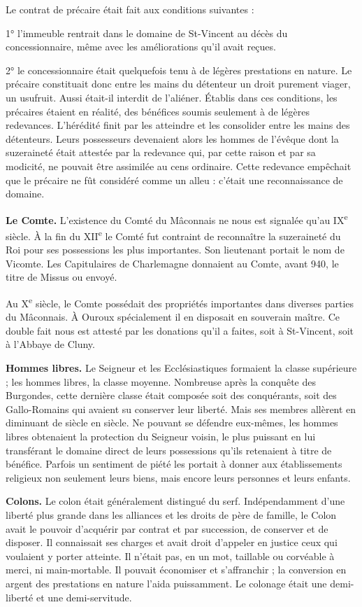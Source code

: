 \documentclass[11pt,a4paper]{report}
\begin{document}
Le contrat de précaire était fait aux conditions suivantes :

1° l'immeuble rentrait dans le domaine de St-Vincent au décès du concessionnaire,
même avec les améliorations qu'il avait reçues.

2° le concessionnaire était quelquefois tenu à de légères prestations en nature.
Le précaire constituait donc entre les mains du détenteur un droit purement
viager, un usufruit. Aussi était-il interdit de l'aliéner. Établis dans ces
conditions, les précaires étaient en réalité, des bénéfices soumis seulement à
de légères redevances. L'hérédité finit par les atteindre et les consolider entre
les mains des détenteurs. Leurs possesseurs devenaient alors les hommes de
l'évêque dont la suzeraineté était attestée par la redevance qui, par cette
raison et par sa modicité, ne pouvait être assimilée au cens ordinaire. Cette
redevance empêchait que le précaire ne fût considéré comme un alleu : c'était une
reconnaissance de domaine.

\textbf{Le Comte.} L'existence du Comté du Mâconnais ne nous est signalée qu'au
IX\textsuperscript{e} siècle. À la fin du XII\textsuperscript{e} le Comté fut
contraint de reconnaître la suzeraineté du Roi pour ses possessions les plus
importantes. Son lieutenant portait le nom de Vicomte. Les Capitulaires de
Charlemagne donnaient au Comte, avant 940, le titre de Missus ou envoyé.

Au X\textsuperscript{e} siècle, le Comte possédait des propriétés importantes
dans diverses parties du Mâconnais. À Ouroux spécialement il en disposait en
souverain maître. Ce double fait nous est attesté par les donations qu'il a
faites, soit à St-Vincent, soit à l'Abbaye de Cluny.

\textbf{Hommes libres.} Le Seigneur et les Ecclésiastiques formaient la classe
supérieure ; les hommes libres, la classe moyenne. Nombreuse après la conquête
des Burgondes, cette dernière classe était composée soit des conquérants, soit
des Gallo-Romains qui avaient su conserver leur liberté. Mais ses membres
allèrent en diminuant de siècle en siècle. Ne pouvant se défendre eux-mêmes, les
hommes libres obtenaient la protection du Seigneur voisin, le plus puissant en
lui transférant le domaine direct de leurs possessions qu'ils retenaient à titre
de bénéfice. Parfois un sentiment de piété les portait à donner aux
établissements religieux non seulement leurs biens, mais encore leurs personnes
et leurs enfants.

\textbf{Colons.} Le colon était généralement distingué du serf. Indépendamment
d'une liberté plus grande dans les alliances et les droits de père de famille,
le Colon avait le pouvoir d'acquérir par contrat et par succession, de conserver
et de disposer. Il connaissait ses charges et avait droit d'appeler en justice
ceux qui voulaient y porter atteinte. Il n'était pas, en un mot, taillable ou
corvéable à merci, ni main-mortable. Il pouvait économiser et s'affranchir ; la
conversion en argent des prestations en nature l'aida puissamment. Le colonage
était une demi-liberté et une demi-servitude.
\end{document}
